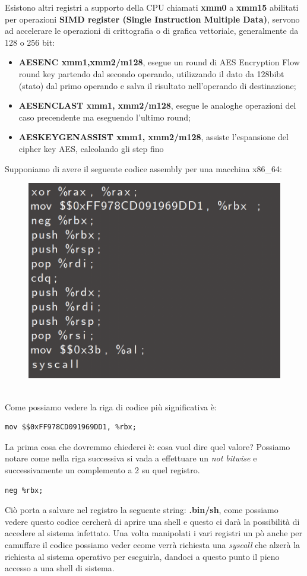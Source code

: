 Esistono altri registri a supporto della CPU chiamati \textbf{xmm0} a \textbf{xmm15} abilitati per operazioni \textbf{SIMD register (Single Instruction Multiple Data)}, servono ad accelerare le operazioni di crittografia o di grafica vettoriale, generalmente da 128 o 256 bit:
\begin{itemize}
    \item \textbf{AESENC xmm1,xmm2/m128}, esegue un round di AES Encryption Flow round key partendo dal secondo operando, utilizzando il dato da 128bibt (stato) dal primo operando e salva il risultato nell'operando di destinazione;
    \item \textbf{AESENCLAST xmm1, xmm2/m128}, esegue le analoghe operazioni del caso precendente ma eseguendo l'ultimo round;
    \item \textbf{AESKEYGENASSIST xmm1, xmm2/m128}, assiste l'espansione del cipher key AES, calcolando gli step fino
\end{itemize}
\begin{ex}
    Supponiamo di avere il seguente codice assembly per una macchina x86\_64:
    \begin{figure}[h!]
        \centering
        \includegraphics[width=.4\linewidth]{res/example_x86_code.png}
        \caption{}
    \end{figure}
    \\
    Come possiamo vedere la riga di codice più significativa è: 
    \begin{lstlisting}[language={[x86masm]Assembler}]
        mov $$0xFF978CD091969DD1, %rbx;
    \end{lstlisting}
    La prima cosa che dovremmo chiederci è: cosa vuol dire quel valore?
    Possiamo notare come nella riga successiva si vada a effettuare un \textit{not bitwise} e successivamente un complemento a 2 su quel registro.
    \begin{lstlisting}[language={[x86masm]Assembler}]
        neg %rbx;
    \end{lstlisting}
    Ciò porta a salvare nel registro la seguente string: \textbf{.bin/sh}, come possiamo vedere questo codice cercherà di aprire una shell e questo ci darà la possibilità di accedere al sistema infettato.
    Una volta manipolati i vari registri un pò anche per camuffare il codice possiamo veder ecome verrà richiesta una \textit{syscall} che alzerà la richiesta al sistema operativo per eseguirla, dandoci a questo punto il pieno accesso a una shell di sistema.
\end{ex}

